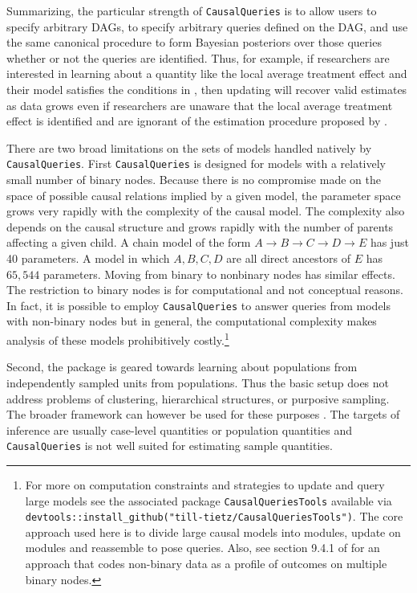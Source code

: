 \documentclass[
  11pt,
  article]{jss}
\begin{document}
Summarizing, the particular strength of \texttt{CausalQueries} is to
allow users to specify arbitrary DAGs, to specify arbitrary queries
defined on the DAG, and use the same canonical procedure to form
Bayesian posteriors over those queries whether or not the queries are
identified. Thus, for example, if researchers are interested in learning
about a quantity like the local average treatment effect and their model
satisfies the conditions in \citet{angrist_identification_1996}, then
updating will recover valid estimates as data grows even if researchers
are unaware that the local average treatment effect is identified and
are ignorant of the estimation procedure proposed by
\citet{angrist_identification_1996}.

There are two broad limitations on the sets of models handled natively
by \texttt{CausalQueries}. First \texttt{CausalQueries} is designed for
models with a relatively small number of binary nodes. Because there is
no compromise made on the space of possible causal relations implied by
a given model, the parameter space grows very rapidly with the
complexity of the causal model. The complexity also depends on the
causal structure and grows rapidly with the number of parents affecting
a given child. A chain model of the form
\(A \rightarrow B \rightarrow C \rightarrow D \rightarrow E\) has just
40 parameters. A model in which \(A, B, C, D\) are all direct ancestors
of \(E\) has \(65,544\) parameters. Moving from binary to nonbinary
nodes has similar effects. The restriction to binary nodes is for
computational and not conceptual reasons. In fact, it is possible to
employ \texttt{CausalQueries} to answer queries from models with
non-binary nodes but in general, the computational complexity makes
analysis of these models prohibitively costly.\footnote{For more on
  computation constraints and strategies to update and query large
  models see the associated package \texttt{CausalQueriesTools}
  available via
  \texttt{devtools::install\_github("till-tietz/CausalQueriesTools")}.
  The core approach used here is to divide large causal models into
  modules, update on modules and reassemble to pose queries. Also, see
  section 9.4.1 of \citet{humphreys_integrated_2023} for an approach
  that codes non-binary data as a profile of outcomes on multiple binary
  nodes.}

Second, the package is geared towards learning about populations from
independently sampled units from populations. Thus the basic setup does
not address problems of clustering, hierarchical structures, or
purposive sampling. The broader framework can however be used for these
purposes \citep[see section 9.4 of][]{humphreys_integrated_2023}. The
targets of inference are usually case-level quantities or population
quantities and \texttt{CausalQueries} is not well suited for estimating
sample quantities.
\end{document}
